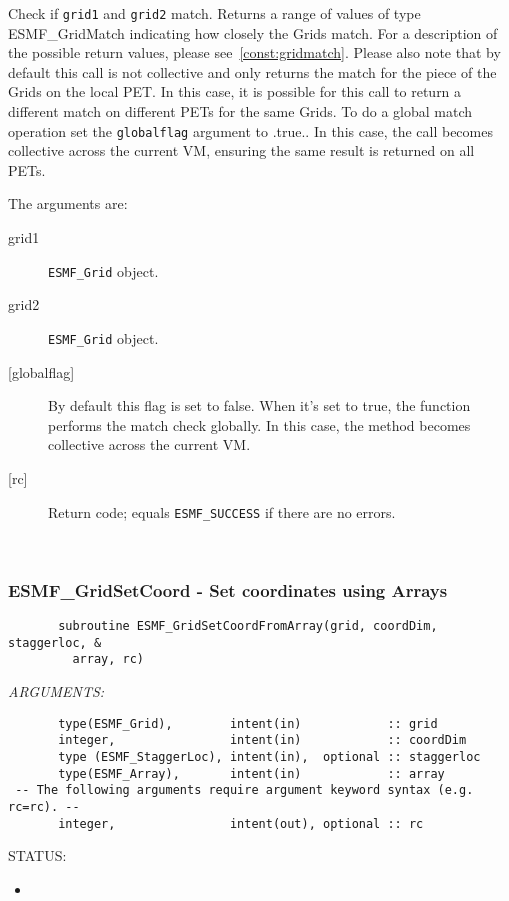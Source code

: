     Check if {\tt grid1} and {\tt grid2} match. Returns a range of values of type
    ESMF\_GridMatch indicating how closely the Grids match. For a description of
    the possible return values, please see~\ref{const:gridmatch}.
    Please also note that by default this call is not collective and only
    returns the match for the piece of the Grids on the local PET. In this case,
    it is possible for this call to return a different match on different PETs
    for the same Grids. To do a global match operation set the {\tt globalflag}
    argument to .true.. In this case, the call becomes collective across the
    current VM, ensuring the same result is returned on all PETs.
  
       The arguments are:
       \begin{description}
       \item[grid1]
            {\tt ESMF\_Grid} object.
       \item[grid2]
            {\tt ESMF\_Grid} object.
       \item[{[globalflag]}]
            By default this flag is set to false. When it's set to true, the
            function performs the match check globally. In this case,
            the method becomes collective across the current VM.
       \item[{[rc]}]
            Return code; equals {\tt ESMF\_SUCCESS} if there are no errors.
       \end{description}
   
 
\mbox{}\hrulefill\ 
 
\subsubsection [ESMF\_GridSetCoord] {ESMF\_GridSetCoord - Set coordinates using Arrays}


 
\begin{verbatim}       subroutine ESMF_GridSetCoordFromArray(grid, coordDim, staggerloc, &
         array, rc)\end{verbatim}{\em ARGUMENTS:}
\begin{verbatim}       type(ESMF_Grid),        intent(in)            :: grid
       integer,                intent(in)            :: coordDim
       type (ESMF_StaggerLoc), intent(in),  optional :: staggerloc
       type(ESMF_Array),       intent(in)            :: array
 -- The following arguments require argument keyword syntax (e.g. rc=rc). --
       integer,                intent(out), optional :: rc\end{verbatim}
{\sf STATUS:}
   \begin{itemize}
   \item{}
   \end{itemize}
  
